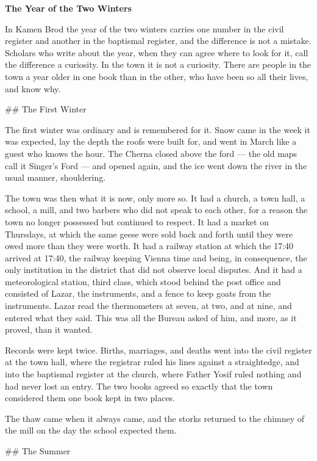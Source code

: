 \documentclass[11pt]{article}
\begin{document}
\begin{center}
{\LARGE\bfseries The Year of the Two Winters}
\end{center}
\bigskip
\noindent In Kamen Brod the year of the two winters carries one number in the civil register and another in the baptismal register, and the difference is not a mistake. Scholars who write about the year, when they can agree where to look for it, call the difference a curiosity. In the town it is not a curiosity. There are people in the town a year older in one book than in the other, who have been so all their lives, and know why.

\#\# The First Winter

The first winter was ordinary and is remembered for it. Snow came in the week it was expected, lay the depth the roofs were built for, and went in March like a guest who knows the hour. The Cherna closed above the ford — the old maps call it Singer's Ford — and opened again, and the ice went down the river in the usual manner, shouldering.

The town was then what it is now, only more so. It had a church, a town hall, a school, a mill, and two barbers who did not speak to each other, for a reason the town no longer possessed but continued to respect. It had a market on Thursdays, at which the same geese were sold back and forth until they were owed more than they were worth. It had a railway station at which the 17:40 arrived at 17:40, the railway keeping Vienna time and being, in consequence, the only institution in the district that did not observe local disputes. And it had a meteorological station, third class, which stood behind the post office and consisted of Lazar, the instruments, and a fence to keep goats from the instruments. Lazar read the thermometers at seven, at two, and at nine, and entered what they said. This was all the Bureau asked of him, and more, as it proved, than it wanted.

Records were kept twice. Births, marriages, and deaths went into the civil register at the town hall, where the registrar ruled his lines against a straightedge, and into the baptismal register at the church, where Father Yosif ruled nothing and had never lost an entry. The two books agreed so exactly that the town considered them one book kept in two places.

The thaw came when it always came, and the storks returned to the chimney of the mill on the day the school expected them.

\#\# The Summer
\end{document}
